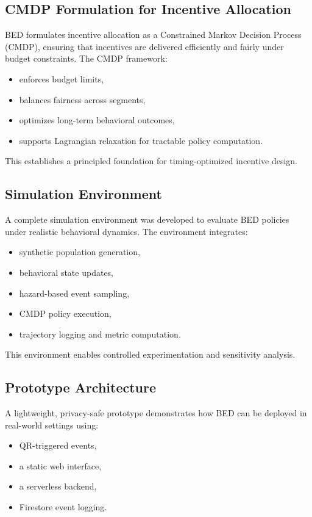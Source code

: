 \subsection{CMDP Formulation for Incentive Allocation}
BED formulates incentive allocation as a Constrained Markov Decision Process
(CMDP), ensuring that incentives are delivered efficiently and fairly under
budget constraints. The CMDP framework:

\begin{itemize}
    \item enforces budget limits,
    \item balances fairness across segments,
    \item optimizes long-term behavioral outcomes,
    \item supports Lagrangian relaxation for tractable policy computation.
\end{itemize}

This establishes a principled foundation for timing-optimized incentive design.

\subsection{Simulation Environment}
A complete simulation environment was developed to evaluate BED policies under
realistic behavioral dynamics. The environment integrates:

\begin{itemize}
    \item synthetic population generation,
    \item behavioral state updates,
    \item hazard-based event sampling,
    \item CMDP policy execution,
    \item trajectory logging and metric computation.
\end{itemize}

This environment enables controlled experimentation and sensitivity analysis.

\subsection{Prototype Architecture}
A lightweight, privacy-safe prototype demonstrates how BED can be deployed in
real-world settings using:

\begin{itemize}
    \item QR-triggered events,
    \item a static web interface,
    \item a serverless backend,
    \item Firestore event logging.
\end{itemize}

